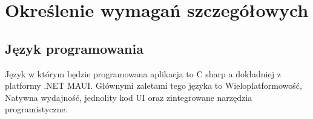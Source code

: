 \newpage
\section{Określenie wymagań szczegółowych}		%

\subsection{\large{Język programowania}}
\hspace*{1em}Język w którym będzie programowana aplikacja to C sharp a dokładniej z platformy .NET MAUI. Głównymi zaletami tego języka to Wieloplatformowość, Natywna wydajność, jednolity kod UI oraz zintegrowane narzędzia programistyczne.

